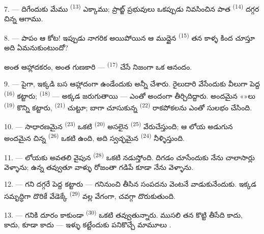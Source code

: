7. --- దిగేందుకు మేము  \textsuperscript{(13)} ఎక్కాము; ప్రాట్జ్
ప్రభువులు ఒకప్పుడు నివసించిన పాత  
\textsuperscript{(14)} దగ్గర చిన్న  ఆగాము.

8. --- పాపం ఆ కోట! ఇప్పుడు నాగరిక  అయిపోయిన ఆ ముద్దైన
 \textsuperscript{(15)} తన కాళ్ళ కింద చూస్తూ అది ఏమనుకుంటుందో?

 అంత ఆహ్లాదకరం,  అంత గుణకారి — 
\textsuperscript{(17)} చేసే  నిజంగా ఒక ఆనందం.

\VUsaut{5.0mm}
\VUsaut{3.4mm}

9. --- పైగా, ఇక్కడి బస ఆహ్లాదంగా ఉండేందుకు అన్నీ చేశారు. రైలుదారి వేసేందుకు వీలుగా పెద్ద
 \textsuperscript{(16)} కట్టారు; 
 \textsuperscript{(18)} — అక్కడ  జరుగుతాయి —
ఎంతో అందంగా తీర్చిదిద్దారు. అందమైన «»లు \textsuperscript{(19)} కొన్ని
కట్టారు,  \textsuperscript{(21)} చుట్టూ; బాగా చూసుకున్న
 \textsuperscript{(22)} రాకపోకలను ఎంతో సులభం చేసింది.

10. --- సాధారణమైన  \textsuperscript{(23)} ఒకటి 
\textsuperscript{(20)} అసలైన  \textsuperscript{(25)} వేరుచేస్తుంది; ఆ లోయ
అడుగున అందమైన చిన్న  \textsuperscript{(26)} ఒకటి ఉంది, అది స్వచ్ఛమైన
 \textsuperscript{(24)} నీళ్ళిస్తుంది.

11. --- లోయకు అవతలి వైపున  \textsuperscript{(28)} ఒకటి నడుస్తోంది.
  దిగడం చూసేందుకు నేను చాలాసార్లు వెళ్ళాను;
 ఉన్న  తవ్వుతూ వాళ్ళు రోజంతా గడిపే 
కూడా నేను వెళ్ళాను.

12. --- గని దగ్గరే పెద్ద  కట్టారు — గనినుంచి తీసిన సంపదను
వెంటనే వాడుకునేందుకు. ఇక్కడ సమృద్ధిగా దొరికే  వేడెక్కే
 \textsuperscript{(29)} వల్ల  వేగంగా, చవగ్గా
దొరుకుతుంది.

13. --- గనికి దూరం కాకుండా  \textsuperscript{(30)} ఒకటి తవ్వుతున్నారు.
ముసలి  తన  కొట్టి తీసేది  కాదు,
 కాదు,  కూడా కాదు — ఇళ్ళు కట్టేందుకు పనికొచ్చే మామూలు
.

